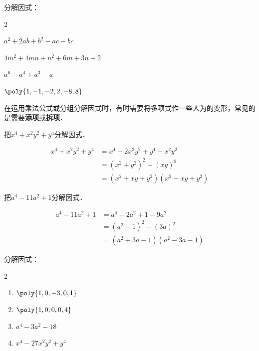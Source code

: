 \begin{ex}
 分解因式：
 \begin{enumerate}
    \begin{multicols}{2}
          \item $a^2+2ab+b^2-ac-bc$
     \item $4m^2+4mn+n^2+6m+3n+2$
     \item $a^6-a^4+a^3-a$
     \item $\poly{1,-1,-2,2,-8,8}$
    \end{multicols}
 \end{enumerate}   
\end{ex}

在运用乘法公式或分组分解因式时，有时需要将多项式作一些人为的变形，常见的是需要\textbf{添项}或\textbf{拆项}．

\begin{example}
    把$x^4+x^2y^2+y^4$分解因式．
\end{example}

\begin{solution}
\begin{align*}
    x^4+x^2y^2+y^4&=x^4+2x^2y^2+y^4 -x^2y^2 \tag{添项}\\
    &=(x^2+y^2)^2-(xy)^2\\
    &=(x^2+xy+y^2)(x^2-xy+y^2)
\end{align*}   
\end{solution}


\begin{example}
    把$a^4-11a^2+1$分解因式．
\end{example}

\begin{solution}
    \begin{align*}
        a^4-11a^2+1&=a^4-2a^2+1-9a^2 \tag{拆项}\\
        &=(a^2-1)^2-(3a)^2\\
        &=(a^2+3a-1)(a^2-3a-1)
    \end{align*}     
\end{solution}

\begin{ex}
    分解因式：
\begin{multicols}{2}
\begin{enumerate}
\item $\poly{1,0,-3,0,1}$
\item $\poly{1,0,0,0,4}$
\item $a^4-3a^2-18$
\item $x^4-27x^2y^2+y^4$
\end{enumerate}
\end{multicols}
\end{ex}


